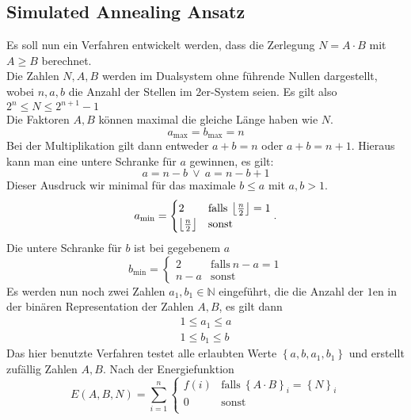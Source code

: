 \subsection{Simulated Annealing Ansatz}
Es soll nun ein Verfahren entwickelt werden, dass die Zerlegung $N=A\cdot B$ mit $A\geq B$ berechnet.\\
Die Zahlen $N,A,B$ werden im Dualsystem ohne führende Nullen dargestellt, wobei $n, a, b$ die Anzahl der Stellen im $2$er-System seien. Es gilt also $2^{n}\leq N \leq 2^{n+1}-1$ \\
Die Faktoren $A, B$ können maximal die gleiche Länge haben wie $N$.
\begin{equation*}
		a_\mathrm{max}=b_\mathrm{max}=n
\end{equation*}
Bei der Multiplikation gilt dann entweder $a+b=n$ oder $a+b=n+1$. Hieraus kann man eine untere Schranke für $a$ gewinnen, es gilt:
\begin{equation*}
		a=n-b \:\vee\: a=n-b+1
\end{equation*}
Dieser Ausdruck wir minimal für das maximale $b \leq a$ mit $a,b>1$.
\begin{equation*}
		a_\mathrm{min}=\begin{cases}
						2 & \mathrm{falls}\:\left\lfloor\frac{n}{2}\right\rfloor = 1 \\
						\left\lfloor\frac{n}{2}\right\rfloor & \mathrm{sonst}
				\end{cases}.
\end{equation*}
Die untere Schranke für $b$ ist bei gegebenem $a$
\begin{equation*}
		b_\mathrm{min}=\begin{cases}
						2 & \mathrm{falls}\:n-a=1 \\
						n-a & \mathrm{sonst}
				\end{cases}
\end{equation*}
Es werden nun noch zwei Zahlen $a_1, b_1\in\mathbb{N}$ eingeführt, die die Anzahl der $1$en in der binären Representation der Zahlen $A, B$, es gilt dann
\begin{align*}
		1\leq a_1\leq a \\
		1\leq b_1\leq b
\end{align*}
Das hier benutzte Verfahren testet alle erlaubten Werte $\left\{a,b,a_1,b_1\right\}$ und erstellt zufällig Zahlen $A,B$. Nach der Energiefunktion
\begin{equation*}
		E\left(A,B,N\right)=\sum\limits_{i=1}^n\begin{cases}
		  		f\left(i\right) & \mathrm{falls}\:{\left\{A\cdot B\right\}}_i={\left\{N\right\}}_i \\
						0 & \mathrm{sonst}\\
				\end{cases}
\end{equation*}
